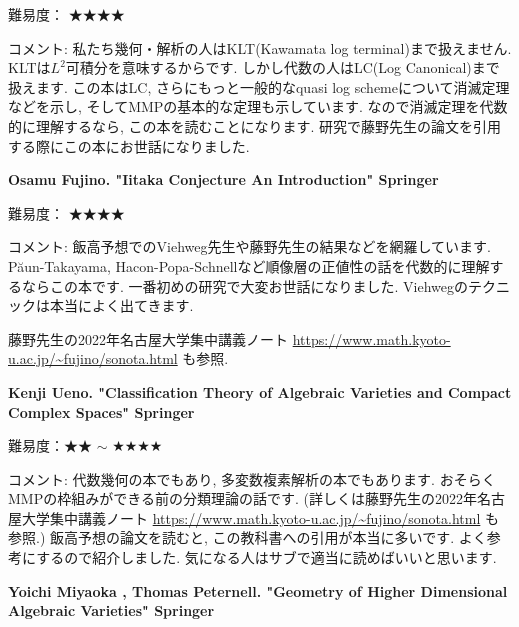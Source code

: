 難易度： ★★★★\vspace{-6pt} 

コメント: 私たち幾何・解析の人はKLT(Kawamata log terminal)まで扱えません. KLTは$L^2$可積分を意味するからです. しかし代数の人はLC(Log Canonical)まで扱えます. この本はLC, さらにもっと一般的なquasi log schemeについて消滅定理などを示し, そしてMMPの基本的な定理も示しています. 
なので消滅定理を代数的に理解するなら, この本を読むことになります. 
研究で藤野先生の論文を引用する際にこの本にお世話になりました. 


\vspace{8pt}


\textbf{Osamu Fujino. "Iitaka Conjecture An Introduction" Springer} \vspace{-6pt}

難易度： ★★★★\vspace{-6pt} 

コメント: 飯高予想でのViehweg先生や藤野先生の結果などを網羅しています. P\u{a}un-Takayama, Hacon-Popa-Schnellなど順像層の正値性の話を代数的に理解するならこの本です.  
一番初めの研究で大変お世話になりました. Viehwegのテクニックは本当によく出てきます. 

藤野先生の2022年名古屋大学集中講義ノート \url{https://www.math.kyoto-u.ac.jp/~fujino/sonota.html} も参照. 
\vspace{8pt}


\textbf{Kenji Ueno. "Classification Theory of Algebraic Varieties and Compact Complex Spaces" Springer}  　\vspace{-6pt} 

難易度：★★ $\sim$ ★★★★  　\vspace{-6pt} 

コメント: 代数幾何の本でもあり, 多変数複素解析の本でもあります. おそらくMMPの枠組みができる前の分類理論の話です. (詳しくは藤野先生の2022年名古屋大学集中講義ノート \url{https://www.math.kyoto-u.ac.jp/~fujino/sonota.html} も参照.) 
飯高予想の論文を読むと, この教科書への引用が本当に多いです. 
よく参考にするので紹介しました. 気になる人はサブで適当に読めばいいと思います. 
\vspace{8pt}

\textbf{Yoichi Miyaoka , Thomas Peternell. "Geometry of Higher Dimensional Algebraic Varieties" Springer} \vspace{-6pt}

